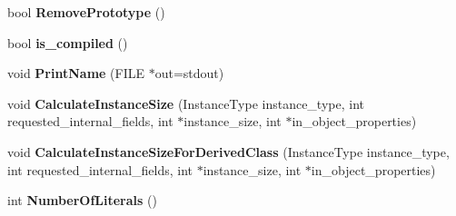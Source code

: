 \begin{DoxyCompactItemize}
\item 
bool {\bfseries Remove\+Prototype} ()\hypertarget{classv8_1_1internal_1_1_j_s_function_a6e566f18a23ee97e6b554b95a5d64bee}{}\label{classv8_1_1internal_1_1_j_s_function_a6e566f18a23ee97e6b554b95a5d64bee}

\item 
bool {\bfseries is\+\_\+compiled} ()\hypertarget{classv8_1_1internal_1_1_j_s_function_a3114e243eaac45ad3bfa6a8b1edc61d3}{}\label{classv8_1_1internal_1_1_j_s_function_a3114e243eaac45ad3bfa6a8b1edc61d3}

\item 
void {\bfseries Print\+Name} (F\+I\+LE $\ast$out=stdout)\hypertarget{classv8_1_1internal_1_1_j_s_function_afdf047a8a215131dc1002a7af9504a66}{}\label{classv8_1_1internal_1_1_j_s_function_afdf047a8a215131dc1002a7af9504a66}

\item 
void {\bfseries Calculate\+Instance\+Size} (Instance\+Type instance\+\_\+type, int requested\+\_\+internal\+\_\+fields, int $\ast$instance\+\_\+size, int $\ast$in\+\_\+object\+\_\+properties)\hypertarget{classv8_1_1internal_1_1_j_s_function_a7f6774a2eca90ece431917b5071493d3}{}\label{classv8_1_1internal_1_1_j_s_function_a7f6774a2eca90ece431917b5071493d3}

\item 
void {\bfseries Calculate\+Instance\+Size\+For\+Derived\+Class} (Instance\+Type instance\+\_\+type, int requested\+\_\+internal\+\_\+fields, int $\ast$instance\+\_\+size, int $\ast$in\+\_\+object\+\_\+properties)\hypertarget{classv8_1_1internal_1_1_j_s_function_aeeccdd9af238735b039e0936dc3c43f8}{}\label{classv8_1_1internal_1_1_j_s_function_aeeccdd9af238735b039e0936dc3c43f8}

\item 
int {\bfseries Number\+Of\+Literals} ()\hypertarget{classv8_1_1internal_1_1_j_s_function_a37aaee971e25f4bbd4a84675eea72cea}{}\label{classv8_1_1internal_1_1_j_s_function_a37aaee971e25f4bbd4a84675eea72cea}

\end{DoxyCompactItemize}
